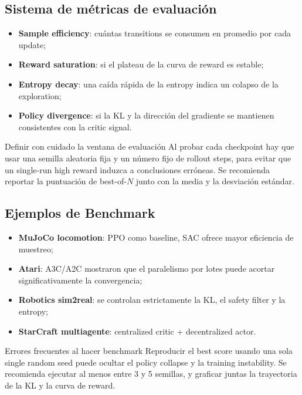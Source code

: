 \documentclass[a4paper]{article}
\begin{document}
\subsection{Sistema de métricas de evaluación}

\begin{itemize}
    \item \textbf{Sample efficiency}: cuántas transitions se consumen en promedio por cada update;
    \item \textbf{Reward saturation}: si el plateau de la curva de reward es estable;
    \item \textbf{Entropy decay}: una caída rápida de la entropy indica un colapso de la exploration;
    \item \textbf{Policy divergence}: si la KL y la dirección del gradiente se mantienen consistentes con la critic signal.
\end{itemize}

\begin{importantbox}{Definir con cuidado la ventana de evaluación}
Al probar cada checkpoint hay que usar una semilla aleatoria fija y un número fijo de rollout steps, para evitar que un single-run high reward induzca a conclusiones erróneas. Se recomienda reportar la puntuación de best-of-$N$ junto con la media y la desviación estándar.
\end{importantbox}

\subsection{Ejemplos de Benchmark}

\begin{itemize}
    \item \textbf{MuJoCo locomotion}: PPO como baseline, SAC ofrece mayor eficiencia de muestreo;
    \item \textbf{Atari}: A3C/A2C mostraron que el paralelismo por lotes puede acortar significativamente la convergencia;
    \item \textbf{Robotics sim2real}: se controlan estrictamente la KL, el safety filter y la entropy;
    \item \textbf{StarCraft multiagente}: centralized critic + decentralized actor.
\end{itemize}

\begin{knowledgebox}{Errores frecuentes al hacer benchmark}
Reproducir el best score usando una sola single random seed puede ocultar el policy collapse y la training instability. Se recomienda ejecutar al menos entre 3 y 5 semillas, y graficar juntas la trayectoria de la KL y la curva de reward.
\end{knowledgebox}
\end{document}

